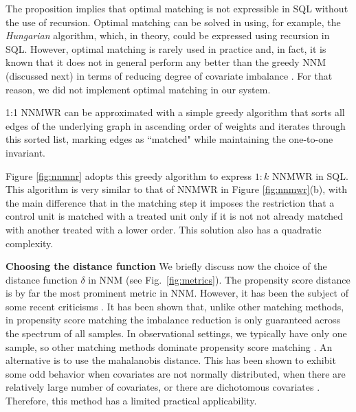 {The proposition implies that optimal matching is not expressible in
SQL without the use of recursion.  Optimal matching can be solved in
\PTIME using, for example, the {\em Hungarian} algorithm, which, in
theory, could be expressed using recursion in SQL.  However, optimal
matching is rarely used in practice and, in fact, it is known that it
does not in general perform any better than the greedy NNM (discussed
next) in terms of reducing degree of covariate imbalance
\cite{Rosenbaum93}.   For that reason, we did not implement optimal
matching in our system.


1:1 NNMWR can be approximated with a simple greedy algorithm that
sorts all edges of the underlying graph in ascending order of weights
and iterates through this sorted list, marking edges as ``matched"
while maintaining the one-to-one invariant.  Figure \ref{fig:nnmnr} adopts this greedy algorithm to
express $1:k$ NNMWR in SQL.  This algorithm is very similar to that of
NNMWR in Figure \ref{fig:nnmwr}(b), with the main difference that in
the matching step it imposes the restriction that a control unit is
matched with a treated unit only if it is not not already matched with
another treated with a lower order.  This solution also has a
quadratic complexity.

{\bf Choosing the distance function} We briefly discuss now the choice
of the distance function $\delta$ in NNM (see Fig.~\ref{fig:metrics}).
The propensity score distance is by far the most prominent metric in
NNM.  However, it has been the subject of some recent criticisms
\cite{king15}.  It has been shown that, unlike other matching methods,
in propensity score matching the imbalance reduction is only
guaranteed across the spectrum of all samples. In observational
settings, we typically have only one sample, so other matching methods
dominate propensity score matching \cite{king15}. An alternative is to use the mahalanobis distance.  This has been
shown to exhibit some odd behavior when covariates are not normally
distributed, when there are relatively large number of covariates, or
there are dichotomous covariates
\cite{rosenbaum2002observational}. Therefore, this method has a
limited practical applicability.


}
